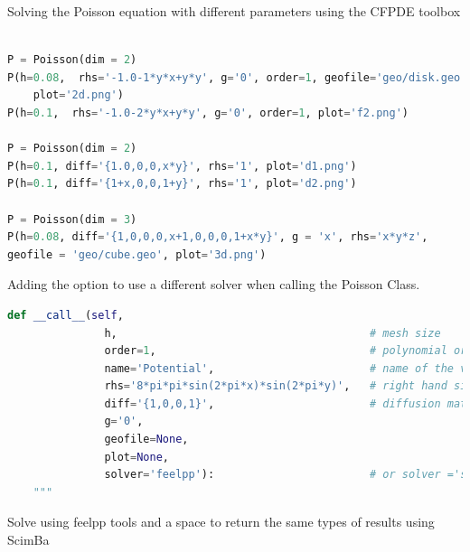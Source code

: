 \documentclass[12pt]{article}
\begin{document}
Solving the Poisson equation with different parameters using the CFPDE toolbox

\begin{lstlisting}[language=Python,caption={},frame=single, backgroundcolor=\color{gray!10}, basicstyle=\footnotesize,rulecolor=\color{blue}, framexleftmargin=3pt, commentstyle=\color{mygreen}, keywordstyle=\color{blue}]

P = Poisson(dim = 2)
P(h=0.08,  rhs='-1.0-1*y*x+y*y', g='0', order=1, geofile='geo/disk.geo',
    plot='2d.png')
P(h=0.1,  rhs='-1.0-2*y*x+y*y', g='0', order=1, plot='f2.png')

P = Poisson(dim = 2)
P(h=0.1, diff='{1.0,0,0,x*y}', rhs='1', plot='d1.png')
P(h=0.1, diff='{1+x,0,0,1+y}', rhs='1', plot='d2.png')

P = Poisson(dim = 3)
P(h=0.08, diff='{1,0,0,0,x+1,0,0,0,1+x*y}', g = 'x', rhs='x*y*z', 
geofile = 'geo/cube.geo', plot='3d.png') 

\end{lstlisting}

Adding the option to use a different solver when calling the Poisson Class.
\begin{lstlisting}[language=Python,caption={},frame=single, backgroundcolor=\color{gray!10}, basicstyle=\footnotesize,rulecolor=\color{blue}, framexleftmargin=3pt, commentstyle=\color{mygreen}, keywordstyle=\color{blue}]
def __call__(self,
               h,                                       # mesh size 
               order=1,                                 # polynomial order 
               name='Potential',                        # name of the variable
               rhs='8*pi*pi*sin(2*pi*x)*sin(2*pi*y)',   # right hand side
               diff='{1,0,0,1}',                        # diffusion matrix
               g='0',
               geofile=None,
               plot=None,
               solver='feelpp'):                        # or solver ='scimba'
    """
\end{lstlisting}

\newpage

Solve using feelpp tools and a space to return the same types of results using ScimBa
\end{document}

